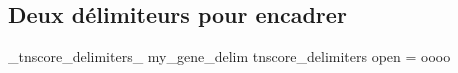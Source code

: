 \documentclass[12pt, a4paper]{article}
\begin{document}


\subsection{Deux délimiteurs pour encadrer}

\ExplSyntaxOn

\DeclareInstance
    {_tnscore_delimiters_}
    {my_gene_delim}
    {tnscore_delimiters}
    {
        open = oooo
    }


\ExplSyntaxOff
\end{document}
